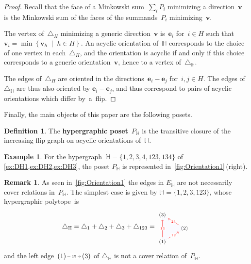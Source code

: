 \documentclass{amsart}
\theoremstyle{definition}
\newtheorem{definition}[theorem]{Definition}
\newtheorem{example}[theorem]{Example}
\newtheorem{remark}[theorem]{Remark}
\renewcommand{\b}[1]{\boldsymbol{#1}} %
\newcommand{\set}[2]{\left\{ #1 \;\middle|\; #2 \right\}} %
\newcommand{\simplex}{\triangle} %
\newcommand{\defn}[1]{\textbf{\textsf{\color{PineGreen} #1}}} %
\newcommand{\HH}{\mathbb H}  %
\newcommand{\flip}[4]{\ensuremath{#1 \, \begin{tikzpicture}[scale=1,baseline=-.1cm] \path[->]  (0,0) edge node[fill=white,inner sep=2pt, font=\tiny ] {$#2#3$} (.7,0); \end{tikzpicture} \, #4}}
\begin{document}
\begin{proof}
Recall that the face of a Minkowski sum~$\sum_i P_i$ minimizing a direction~$\b{v}$ is the Minkowski sum of the faces of the summands~$P_i$ minimizing~$\b{v}$.

The vertex of~$\simplex_H$ minimizing a generic direction~$\b{v}$ is~$\b{e}_i$ for~$i \in H$ such that~$\b{v}_i = \min\set{\b{v}_h\!}{\!h \!\in\! H}$.
An acyclic orientation of~$\HH$ corresponds to the choice of one vertex in each~$\simplex_H$, and the orientation is acyclic if and only if this choice corresponds to a generic orientation~$\b{v}$, hence to a vertex of~$\simplex_\HH$.

The edges of~$\simplex_H$ are oriented in the directions~$\b{e}_i-\b{e}_j$ for~$i,j \in H$.
The edges of~$\simplex_\HH$ are thus also oriented by $\b{e}_i-\b{e}_j$, and thus correspond to pairs of acyclic orientations which differ by~a~flip.
\end{proof}

Finally, the main objects of this paper are the following posets.

\begin{definition}
The \defn{hypergraphic poset}~$P_\HH$ is the transitive closure of the increasing flip graph on acyclic orientations of~$\HH$.
\end{definition}

\begin{example}
\label{ex:DH4}
For the hypergraph~$\HH=\{ 1, 2, 3, 4, 123, 134 \}$ of \cref{ex:DH1,ex:DH2,ex:DH3}, the poset  $P_\HH$ is represented in~\cref{fig:Orientation1}\,(right).
\end{example}

\begin{remark}
\label{rem:edgeNotCover}
As seen in~\cref{fig:Orientation1} the edges in $E_\HH$ are not necessarily cover relations in~$P_\HH$.
The simplest case is given by
$\HH=\{ 1, 2, 3, 123 \}$, 
whose hypergraphic polytope~is
\[
	\simplex_\HH = \simplex_1 + \simplex_2 + \simplex_3 + \simplex_{123} =
	\begin{tikzpicture}[scale=.7,baseline=.0cm]
		\draw [color=gray!10,fill=blue!2] (0,-1)--(0,1)--(1.632,0)--(0,-1) ; 
		\node (a) at (0,-1) {$\scriptstyle (1)$};
		\node (b) at (1.632,0) {$\scriptstyle (2)$};
		\node (c) at (0,1) {$\scriptstyle (3)$};
		\path[color=red, ->] (a) edge node[fill=white,inner sep=1pt, font=\tiny ] {$ \scriptscriptstyle 13 $} (c);
		\path[color=red, ->] (a) edge node[fill=white,inner sep=1pt, font=\tiny ] {$\scriptscriptstyle  12 $} (b);
		\path[color=red, ->] (b) edge node[fill=white,inner sep=1pt, font=\tiny ] {$ \scriptscriptstyle 23 $} (c);
	\end{tikzpicture}
\]
and the left edge~$\flip{(1)}{1}{3}{(3)}$ of $\simplex_\HH$ is not a cover relation of~$P_\HH$.
\end{remark}
\end{document}
